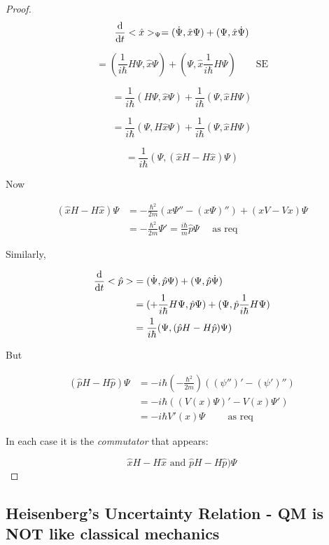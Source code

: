 \documentclass[a4paper]{article}
\begin{document}
\begin{proof}
	\[ \frac{\mathrm{d} }{\mathrm{d} t} <\hat{x}>_{\Psi} = (\dot{\Psi}, \hat{x} \Psi ) + (\Psi, \hat{x} \dot{\Psi} ) \]
	
	\[  = (\frac{1}{i \hbar}  H \Psi, \hat{x} \Psi  )   + (\Psi,  \hat{x} \frac{1}{i \hbar}  H \Psi   ) \qquad \text{SE} \]
	
	\[ = \frac{1}{i \hbar}(  H \Psi, \hat{x} \Psi  )   + \frac{1}{i \hbar}(\Psi,  \hat{x} H \Psi   ) \]
	
	\[ = \frac{1}{i \hbar}( \Psi, H \hat{x} \Psi  )   + \frac{1}{i \hbar}(\Psi,  \hat{x} H \Psi   ) \]
	
		\[ = \frac{1}{i \hbar}( \Psi, (\hat{x} H - H \hat{x}  ) \Psi   ) \]
	
	Now
	
	\begin{align*}
	(\hat{x} H - H \hat{x}  ) \Psi & = - \frac{\hbar^{2}}{2m}(x \Psi'' - (x \Psi)'') + (xV - Vx) \Psi  \\
	& = - \frac{\hbar^{2}}{2m} \Psi' = \frac{i\hbar}{m} \hat{p} \Psi \quad \text{ as req}
	\end{align*}
	
	
	Similarly, 
	
	\begin{align*}
	\frac{\mathrm{d} }{\mathrm{d} t}  <\hat{p}>  & =  (\dot{\Psi}, \hat{p} \Psi )  + (\Psi, \hat{p}  \dot{\Psi} )  \\
	& = (+ \frac{1}{i \hbar}H \Psi, \hat{p} \Psi  ) + (\Psi, \hat{p} \frac{1}{i \hbar } H \Psi  ) \\
	& = \frac{1}{i \hbar} (\Psi, (\hat{p}H - H\hat{p})\Psi  ) 
	\end{align*}
	
	But
	
	\begin{align*}
	(\hat{p}H - H\hat{p})\Psi& = - i \hbar \left( - \frac{\hbar^{2}}{2m} \right) \left(  (\psi'')' - (\psi')'' \right)   \\
	& = - i \hbar \left(  (V(x)\Psi)' - V(x)  \Psi' \right) \\
	& = - i \hbar V'(x) \Psi \qquad \text{ as req}
	\end{align*}
	
	In each case it is the \emph{commutator} that appears:
	
	\[ \hat{x} H - H \hat{x}  \text{ and } \hat{p}H - H\hat{p})\Psi\]
	
	
	
\end{proof}


\subsection{Heisenberg's Uncertainty Relation - QM is NOT like classical mechanics}
\end{document}
